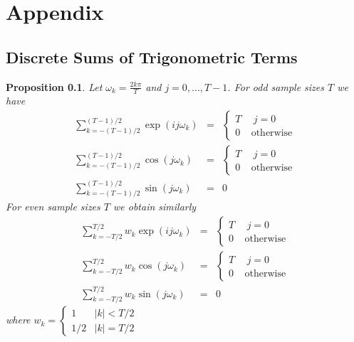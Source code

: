 \documentclass[a4paper]{book}
\newtheorem{Proposition}{Proposition}
\newcommand{\Appendix}
{%
\def\thesection{Appendix~\Alph{chapter}}
\def\thesubsection{A.\arabic{section}}
}
\begin{document}
\chapter*{Appendix} \begin{appendix} \Appendix    
\renewcommand{\theequation}{A.\arabic{equation}}
\setcounter{equation}{0} 


\section{Discrete Sums of Trigonometric Terms }\label{dstt}

\begin{Proposition}\label{discret_sums}
Let $\displaystyle{\omega_k=\frac{2k\pi}{T}}$ and $j=0,...,T-1$. For odd sample sizes $T$ we have
\begin{eqnarray*}
\sum_{k=-(T-1)/2}^{(T-1)/2} \exp(ij\omega_k)&=&\left\{\begin{array}{cc}T~&~j=0\\0~&\textrm{otherwise}\end{array}\right.\\
\sum_{k=-(T-1)/2}^{(T-1)/2} \cos(j\omega_k)&=&\left\{\begin{array}{cc}T~&~j=0\\0~&\textrm{otherwise}\end{array}\right.\\
\sum_{k=-(T-1)/2}^{(T-1)/2} \sin(j\omega_k)&=&0
\end{eqnarray*}
For even sample sizes $T$ we obtain similarly
\begin{eqnarray*}
\sum_{k=-T/2}^{T/2} w_k\exp(ij\omega_k)&=&\left\{\begin{array}{cc}T~&~j=0\\0~&\textrm{otherwise}\end{array}\right.\\
\sum_{k=-T/2}^{T/2} w_k\cos(j\omega_k)&=&\left\{\begin{array}{cc}T~&~j=0\\0~&\textrm{otherwise}\end{array}\right.\\
\sum_{k=-T/2}^{T/2} w_k\sin(j\omega_k)&=&0
\end{eqnarray*}
where $w_k=\left\{\begin{array}{cc}1&|k|<T/2\\1/2&|k|=T/2\end{array}\right.$
 \end{Proposition}


\end{appendix}
\end{document}
